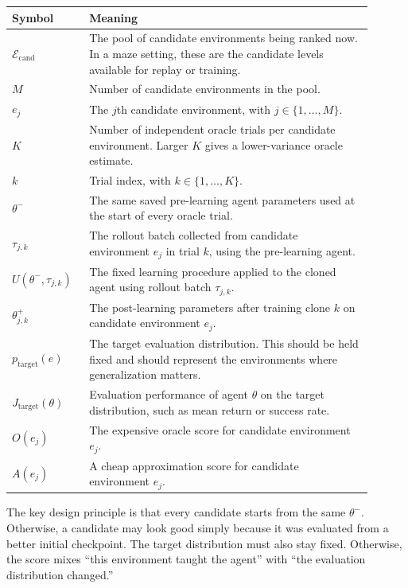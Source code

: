 \documentclass[11pt]{article}
\begin{document}
\begin{center}
\small
\begin{tabular}{
  >{\raggedright\arraybackslash}p{0.18\linewidth}
  >{\raggedright\arraybackslash}p{0.72\linewidth}
}
\toprule
Symbol & Meaning \\
\midrule
$\mathcal{E}_{\mathrm{cand}}$ & The pool of candidate environments being
ranked now. In a maze setting, these are the candidate levels available for
replay or training. \\
$M$ & Number of candidate environments in the pool. \\
$e_j$ & The $j$th candidate environment, with $j \in \{1,\ldots,M\}$. \\
$K$ & Number of independent oracle trials per candidate environment. Larger
$K$ gives a lower-variance oracle estimate. \\
$k$ & Trial index, with $k \in \{1,\ldots,K\}$. \\
$\theta^-$ & The same saved pre-learning agent parameters used at the start of
every oracle trial. \\
$\tau_{j,k}$ & The rollout batch collected from candidate environment $e_j$ in
trial $k$, using the pre-learning agent. \\
$U(\theta^-,\tau_{j,k})$ & The fixed learning procedure applied to the cloned
agent using rollout batch $\tau_{j,k}$. \\
$\theta_{j,k}^+$ & The post-learning parameters after training clone $k$ on
candidate environment $e_j$. \\
$p_{\mathrm{target}}(e)$ & The target evaluation distribution. This should be
held fixed and should represent the environments where generalization matters. \\
$J_{\mathrm{target}}(\theta)$ & Evaluation performance of agent $\theta$ on the
target distribution, such as mean return or success rate. \\
$O(e_j)$ & The expensive oracle score for candidate environment $e_j$. \\
$A(e_j)$ & A cheap approximation score for candidate environment $e_j$. \\
\bottomrule
\end{tabular}
\end{center}

The key design principle is that every candidate starts from the same
$\theta^-$. Otherwise, a candidate may look good simply because it was evaluated
from a better initial checkpoint. The target distribution must also stay fixed.
Otherwise, the score mixes ``this environment taught the agent'' with ``the
evaluation distribution changed.''
\end{document}
